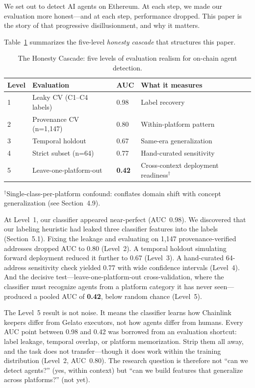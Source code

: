 \documentclass[sigconf,nonacm=false]{acmart}
\begin{document}
We set out to detect AI agents on Ethereum. At each step, we made our evaluation more honest---and at each step, performance dropped. This paper is the story of that progressive disillusionment, and why it matters.

Table~\ref{tab:cascade} summarizes the five-level \emph{honesty cascade} that structures this paper.

\begin{table}[h]
\centering
\small
\caption{The Honesty Cascade: five levels of evaluation realism for on-chain agent detection.}
\label{tab:cascade}
\begin{tabular}{llll}
\toprule
Level & Evaluation & AUC & What it measures \\
\midrule
1 & Leaky CV (C1--C4 labels) & 0.98 & Label recovery \\
2 & Provenance CV (n=1{,}147) & 0.80 & Within-platform pattern \\
3 & Temporal holdout & 0.67 & Same-era generalization \\
4 & Strict subset (n=64) & 0.77 & Hand-curated sensitivity \\
5 & Leave-one-platform-out & \textbf{0.42} & Cross-context deployment readiness$^\dagger$ \\
\bottomrule
\end{tabular}

\smallskip
{\footnotesize $^\dagger$Single-class-per-platform confound: conflates domain shift with concept generalization (see Section~4.9).}
\end{table}

At Level~1, our classifier appeared near-perfect (AUC~0.98). We discovered that our labeling heuristic had leaked three classifier features into the labels (Section~5.1). Fixing the leakage and evaluating on 1{,}147 provenance-verified addresses dropped AUC to 0.80 (Level~2). A temporal holdout simulating forward deployment reduced it further to 0.67 (Level~3). A hand-curated 64-address sensitivity check yielded 0.77 with wide confidence intervals (Level~4). And the decisive test---leave-one-platform-out cross-validation, where the classifier must recognize agents from a platform category it has never seen---produced a pooled AUC of \textbf{0.42}, below random chance (Level~5).

The Level~5 result is not noise. It means the classifier learns how Chainlink keepers differ from Gelato executors, not how agents differ from humans. Every AUC point between 0.98 and 0.42 was borrowed from an evaluation shortcut: label leakage, temporal overlap, or platform memorization. Strip them all away, and the task does not transfer---though it does work within the training distribution (Level~2, AUC~0.80). The research question is therefore not ``can we detect agents?'' (yes, within context) but ``can we build features that generalize across platforms?'' (not yet).
\end{document}
